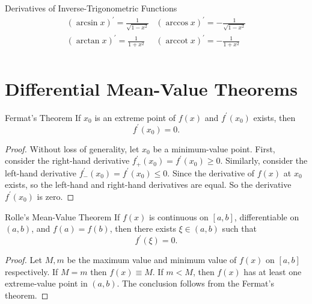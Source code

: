 \begin{proposition}{Derivatives of Inverse-Trigonometric Functions}{}
  \begin{equation}
    \begin{array}{ll}
      (\arcsin x)^{\prime} = \frac{1}{\sqrt{1 - x^2}} & (\arccos x)^{\prime} = - \frac{1}{\sqrt{1 - x^2}} \\
      (\arctan x)^{\prime} = \frac{1}{1 + x^2} & (\operatorname{arccot} x)^{\prime} = - \frac{1}{1 + x^2} \\
    \end{array}
  \end{equation}
\end{proposition}

\section{Differential Mean-Value Theorems}

\begin{theorem}{Fermat's Theorem}{}
  If $x_0$ is an extreme point of $f(x)$ and $f^{\prime}(x_0)$ exists,
  then
  \begin{equation}
    f^{\prime}(x_0) = 0.
  \end{equation}
\end{theorem}

\begin{proof}
  Without loss of generality, let $x_0$ be a minimum-value point.
  First, consider the right-hand derivative $f_+^{\prime}(x_0) = f^{\prime}(x_0)
  \geq 0$.
  Similarly, consider the left-hand derivative $f_-^{\prime}(x_0) =
  f^{\prime}(x_0) \leq 0$.
  Since the derivative of $f(x)$ at $x_0$ exists,
  so the left-hand and right-hand derivatives are equal.
  So the derivative $f^{\prime}(x_0)$ is zero.
\end{proof}

\begin{theorem}{Rolle's Mean-Value Theorem}{}
  If $f(x)$ is continuous on $[a, b]$,
  differentiable on $(a, b)$,
  and $f(a) = f(b)$,
  then there exists $\xi \in (a, b)$ such that
  \begin{equation}
    f^{\prime}(\xi) = 0.
  \end{equation}
\end{theorem}

\begin{proof}
  Let $M, m$ be the maximum value and minimum value of $f(x)$ on $[a, b]$ respectively.
  If $M = m$ then $f(x) \equiv M$.
  If $m < M$, then $f(x)$ has at least one extreme-value point in $(a, b)$.
  The conclusion follows from the Fermat's theorem.
\end{proof}

